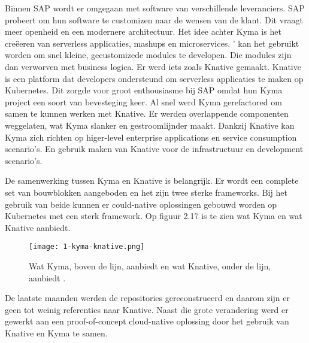 Binnen SAP wordt er omgegaan met software van verschillende leveranciers. SAP probeert om hun software te customizen naar de  wensen van de klant. Dit vraagt meer openheid en een modernere architectuur. 
Het idee achter Kyma is het creëeren van serverless applicaties, mashups en microservices. ' kan het gebruikt worden om snel kleine, gecustomizede modules te developen. Die modules zijn dan verworven met business logica. 
Er  werd iets zoals Knative gemaakt. Knative is een platform dat developers ondersteund om serverless applicaties te maken op Kubernetes. Dit zorgde voor groot enthousiasme bij SAP omdat hun Kyma project een soort van bevesteging keer. Al snel  werd Kyma gerefactored om samen te kunnen  werken met Knative. Er  werden overlappende componenten  weggelaten, wat Kyma slanker en gestroomlijnder maakt. Dankzij Knative kan Kyma zich richten op higer-level enterprise applications en service consumption scenario's. En gebruik maken van Knative voor de infrastructuur en development scenario's. \textcite{Semerdzhiev2018}

 De samenwerking tussen Kyma en Knative is belangrijk. Er wordt een complete set van bouwblokken aangeboden en het zijn twee sterke frameworks. Bij het gebruik van beide kunnen er could-native oplossingen gebouwd worden op Kubernetes met een sterk framework. Op figuur 2.17 is te zien wat Kyma en wat Knative aanbiedt. \textcite{Hofmann2018}
\begin{figure}[h]
	\texttt{[image: 1-kyma-knative.png]}
	\caption{Wat Kyma, boven de lijn, aanbiedt en wat Knative, onder de lijn, aanbiedt \textcite{Hofmann2018}.}
	\centering
\end{figure}
De laatste maanden  werden de repositories gereconstrueerd en daarom zijn er geen tot  weinig referenties naar Knative. Naast die grote verandering  werd er gewerkt aan een proof-of-concept cloud-native oplossing door het gebruik van Knative en Kyma te samen. 

